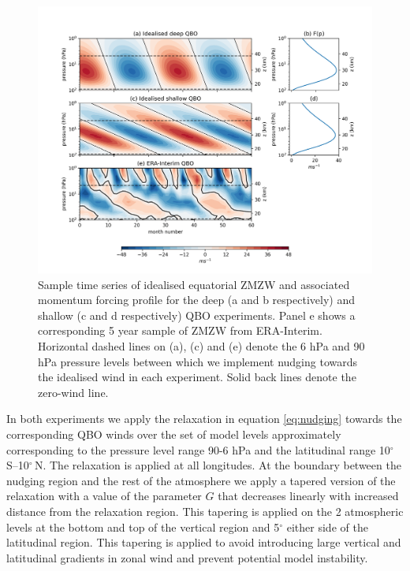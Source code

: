 \begin{figure}[h!]
\begin{center}
\noindent\includegraphics[width = \linewidth]{Figures/Figures-deepQBO/Idealised_QBO_features.png}
\caption[Idealised QBO winds used for nudging experiments]{Sample time series of idealised equatorial ZMZW and associated momentum forcing profile for the deep (a and b respectively) and shallow (c and d respectively) QBO experiments. Panel e shows a corresponding 5 year sample of ZMZW from ERA-Interim. Horizontal dashed lines on (a), (c) and (e) denote the 6 hPa and 90 hPa pressure levels between which we implement nudging towards the idealised wind in each experiment. Solid back lines denote the zero-wind line.}
\label{fig:Idealised_QBO_samples}
\end{center}
\end{figure}

In both experiments we apply the relaxation in equation \ref{eq:nudging} towards the corresponding QBO winds over the set of model levels approximately corresponding to the pressure level range 90-6 hPa and the latitudinal range 10$^{\circ}$\,S--10$^{\circ}$\,N. The relaxation is applied at all longitudes. At the boundary between the nudging region and the rest of the atmosphere we apply a tapered version of the relaxation with a value of the parameter $G$ that decreases linearly with increased distance from the relaxation region. This tapering is applied on the 2 atmospheric levels at the bottom and top of the vertical region and 5$^\circ$ either side of the latitudinal region. This tapering is applied to avoid introducing large vertical and latitudinal gradients in zonal wind and prevent potential model instability. 

